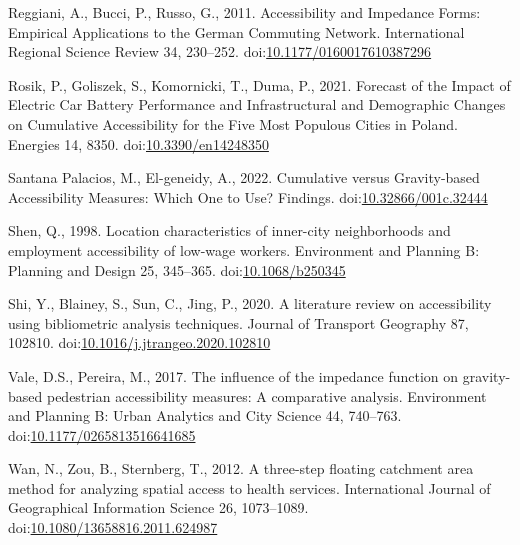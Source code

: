\documentclass[]{elsarticle} %
\newlength{\cslhangindent}
\newlength{\cslentryspacingunit} %
\newenvironment{CSLReferences}[2] %
 {%
  \setlength{\parindent}{0pt}
  \ifodd #1
  \let\oldpar\par
  \def\par{\hangindent=\cslhangindent\oldpar}
  \fi
  \setlength{\parskip}{#2\cslentryspacingunit}
 }%
 {}
\begin{document}
\begin{CSLReferences}{1}{0}
\leavevmode{}%
Reggiani, A., Bucci, P., Russo, G., 2011. Accessibility and {Impedance}
{Forms}: {Empirical} {Applications} to the {German} {Commuting}
{Network}. International Regional Science Review 34, 230--252.
doi:\href{https://doi.org/10.1177/0160017610387296}{10.1177/0160017610387296}

\leavevmode{}%
Rosik, P., Goliszek, S., Komornicki, T., Duma, P., 2021. Forecast of the
{Impact} of {Electric} {Car} {Battery} {Performance} and
{Infrastructural} and {Demographic} {Changes} on {Cumulative}
{Accessibility} for the {Five} {Most} {Populous} {Cities} in {Poland}.
Energies 14, 8350.
doi:\href{https://doi.org/10.3390/en14248350}{10.3390/en14248350}

\leavevmode{}%
Santana Palacios, M., El-geneidy, A., 2022. Cumulative versus
Gravity-based Accessibility Measures: Which One to Use? Findings.
doi:\href{https://doi.org/10.32866/001c.32444}{10.32866/001c.32444}

\leavevmode{}%
Shen, Q., 1998. Location characteristics of inner-city neighborhoods and
employment accessibility of low-wage workers. Environment and Planning
B: Planning and Design 25, 345--365.
doi:\href{https://doi.org/10.1068/b250345}{10.1068/b250345}

\leavevmode{}%
Shi, Y., Blainey, S., Sun, C., Jing, P., 2020. A literature review on
accessibility using bibliometric analysis techniques. Journal of
Transport Geography 87, 102810.
doi:\href{https://doi.org/10.1016/j.jtrangeo.2020.102810}{10.1016/j.jtrangeo.2020.102810}

\leavevmode{}%
Vale, D.S., Pereira, M., 2017. The influence of the impedance function
on gravity-based pedestrian accessibility measures: {A} comparative
analysis. Environment and Planning B: Urban Analytics and City Science
44, 740--763.
doi:\href{https://doi.org/10.1177/0265813516641685}{10.1177/0265813516641685}

\leavevmode{}%
Wan, N., Zou, B., Sternberg, T., 2012. A three-step floating catchment
area method for analyzing spatial access to health services.
International Journal of Geographical Information Science 26,
1073--1089.
doi:\href{https://doi.org/10.1080/13658816.2011.624987}{10.1080/13658816.2011.624987}


\end{CSLReferences}
\end{document}
